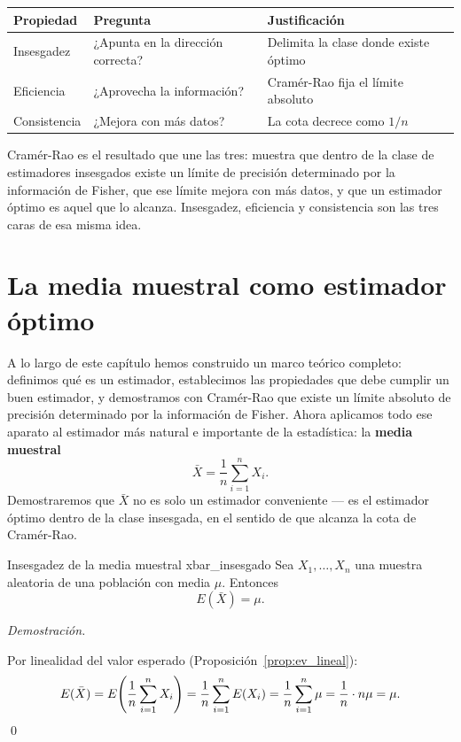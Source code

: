 \documentclass[12pt, a4paper]{book}
\renewenvironment{proof}{%
    \par\medskip\noindent\textit{Demostraci\'{o}n.}\enspace
}{\qed\par\medskip}
\numberwithin{equation}{chapter}
\begin{document}
\begin{center}
	\begin{tabular}{lll}
		\toprule
		\textbf{Propiedad} & \textbf{Pregunta} &
		\textbf{Justificaci\'{o}n} \\
		\midrule
		Insesgadez &
		¿Apunta en la direcci\'{o}n correcta? &
		Delimita la clase donde existe \'{o}ptimo \\[4pt]
		Eficiencia &
		¿Aprovecha la informaci\'{o}n? &
		Cram\'{e}r-Rao fija el l\'{i}mite absoluto \\[4pt]
		Consistencia &
		¿Mejora con m\'{a}s datos? &
		La cota decrece como $1/n$ \\
		\bottomrule
	\end{tabular}
\end{center}

\medskip
Cram\'{e}r-Rao es el resultado que une las tres: muestra
que dentro de la clase de estimadores insesgados existe
un l\'{i}mite de precisi\'{o}n determinado por la
informaci\'{o}n de Fisher, que ese l\'{i}mite mejora con
m\'{a}s datos, y que un estimador \'{o}ptimo es aquel
que lo alcanza. Insesgadez, eficiencia y consistencia
son las tres caras de esa misma idea.

\section{La media muestral como estimador \'{o}ptimo}

A lo largo de este cap\'{i}tulo hemos construido un
marco te\'{o}rico completo: definimos qu\'{e} es un
estimador, establecimos las propiedades que debe cumplir
un buen estimador, y demostramos con Cram\'{e}r-Rao que
existe un l\'{i}mite absoluto de precisi\'{o}n determinado
por la informaci\'{o}n de Fisher. Ahora aplicamos todo ese
aparato al estimador m\'{a}s natural e importante de la
estad\'{i}stica: la \textbf{media muestral}
\[
\bar{X} = \frac{1}{n}\sum_{i=1}^n X_i.
\]
Demostraremos que $\bar{X}$ no es solo un estimador
conveniente --- es el estimador \'{o}ptimo dentro de la
clase insesgada, en el sentido de que alcanza la cota de
Cram\'{e}r-Rao.

\begin{proposicion}{Insesgadez de la media muestral}
	{xbar_insesgado}
	Sea $X_1, \ldots, X_n$ una muestra aleatoria de una
	poblaci\'{o}n con media $\mu$. Entonces
	\[
	E(\bar{X}) = \mu.
	\]
\end{proposicion}

\begin{proof}
	Por linealidad del valor esperado
	(Proposici\'{o}n~\ref{prop:ev_lineal}):
	\[
	E(\bar{X})
	= E\!\left(\frac{1}{n}\sum_{i=1}^n X_i\right)
	= \frac{1}{n}\sum_{i=1}^n E(X_i)
	= \frac{1}{n}\sum_{i=1}^n \mu
	= \frac{1}{n}\cdot n\mu
	= \mu. \qedhere
	\]
\end{proof}
\end{document}

